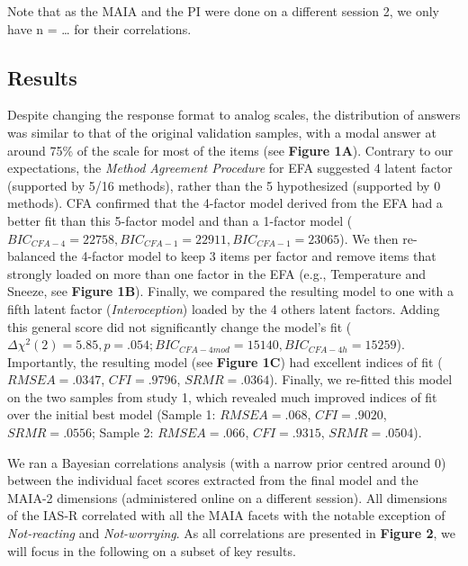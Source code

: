 \documentclass[
  man,floatsintext]{apa6}
\begin{document}
Note that as the MAIA and the PI were done on a different session 2, we only have n = \ldots{} for their correlations.

\hypertarget{results-1}{%
\subsection{Results}\label{results-1}}

Despite changing the response format to analog scales, the distribution of answers was similar to that of the original validation samples, with a modal answer at around 75\% of the scale for most of the items (see \textbf{Figure 1A}). Contrary to our expectations, the \emph{Method Agreement Procedure} for EFA suggested 4 latent factor (supported by 5/16 methods), rather than the 5 hypothesized (supported by 0 methods). CFA confirmed that the 4-factor model derived from the EFA had a better fit than this 5-factor model and than a 1-factor model (\(BIC_{CFA-4} = 22758, BIC_{CFA-1} = 22911, BIC_{CFA-1} = 23065\)). We then re-balanced the 4-factor model to keep 3 items per factor and remove items that strongly loaded on more than one factor in the EFA (e.g., Temperature and Sneeze, see \textbf{Figure 1B}). Finally, we compared the resulting model to one with a fifth latent factor (\emph{Interoception}) loaded by the 4 others latent factors. Adding this general score did not significantly change the model's fit (\(\Delta \chi^2(2) = 5.85, p = .054; BIC_{CFA-4mod} = 15140, BIC_{CFA-4h} = 15259\)). Importantly, the resulting model (see \textbf{Figure 1C}) had excellent indices of fit (\(RMSEA = .0347\), \(CFI = .9796\), \(SRMR = .0364\)). Finally, we re-fitted this model on the two samples from study 1, which revealed much improved indices of fit over the initial best model (Sample 1: \(RMSEA = .068\), \(CFI = .9020\), \(SRMR = .0556\); Sample 2: \(RMSEA = .066\), \(CFI = .9315\), \(SRMR = .0504\)).

We ran a Bayesian correlations analysis (with a narrow prior centred around 0)
between the individual facet scores extracted from the final model and the MAIA-2 dimensions (administered online on a different session). All dimensions of the IAS-R correlated with all the MAIA facets with the notable exception of \emph{Not-reacting} and \emph{Not-worrying}. As all correlations are presented in \textbf{Figure 2}, we will focus in the following on a subset of key results.
\end{document}
